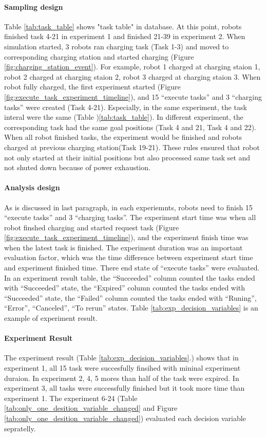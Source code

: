 \paragraph{Sampling design}
Table \ref{tab:task_table} shows "task table" in database. At this point, robots finished task 4-21 in experiment 1 and finished 21-39 in experiment 2. When simulation started, 3 robots ran charging task (Task 1-3) and moved to corresponding charging station and started charging (Figure \ref{fig:charging_station_event}). For example, robot 1 charged at charging staion 1, robot 2 charged at charging staion 2, robot 3 charged at charging staion 3. 
    When robot fully charged, the first experiment started (Figure \ref{fig:execute_task_experiment_timeline}), and 15 ``execute tasks'' and 3 ``charging tasks'' were created (Task 4-21). Especially, in the same experiment, the task interal were the same (Table )\ref{tab:task_table}). In different experiment, the corresponding task had the same goal positions (Task 4 and 21, Task 4 and 22). 
    When all robot finished tasks, the experiment would be finished and robots charged at previous charging station(Task 19-21).
    These rules ensured that robot not only started at their initial positions but also processed same task set and not shuted down because of power exhaustion.

\paragraph{Analysis design}
As is discussed in last paragraph, in each experiemnts, robots need to finish 15 ``execute tasks'' and 3 ``charging tasks''.
The experiment start time was when all robot finshed charging and started request task (Figure \ref{fig:execute_task_experiment_timeline}), and the experiment finish time was when the latest task is finished.
The experiment duration was an important evaluation factor, which was the time difference between experiment start time and experiment finished time.  
There end state of ``execute tasks'' were evaluated. In an experiment result table, the ``Succeeded'' column counted the tasks ended with ``Succeeded'' state, the ``Expired'' column counted the tasks ended with ``Succeeded'' state, the ``Failed'' column counted the tasks ended with ``Runing'', ``Error'', ``Canceled'', ``To rerun'' states. 
Table \ref{tab:exp_decision_variables} is an example of experiment result. 

\paragraph{Experiment Result} 
The experiment result (Table \ref{tab:exp_decision_variables}.) shows that in experiment 1, all 15 task were succesfully finsihed with mininal experiment duraion. In experiment 2, 4, 5 mores than half of the task were expired. In experiment 3, all tasks were successfully finished but it took more time than experiment 1. 
The experiment 6-24 (Table \ref{tab:only_one_desition_variable_changed} and Figure \ref{tab:only_one_desition_variable_changed}) evaluated each decision variable sepratelly. 

